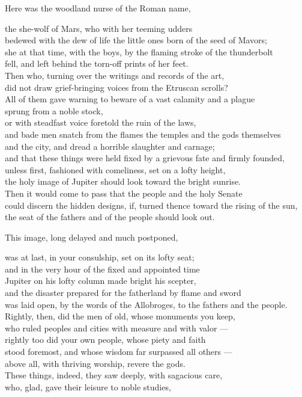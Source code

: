  Here was the woodland nurse of the Roman name,

the she-wolf of Mars, who with her teeming udders \\
bedewed with the dew of life the little ones born of the seed of Mavors; \\
she at that time, with the boys, by the flaming stroke of the thunderbolt \\
fell, and left behind the torn-off prints of her feet. \\
Then who, turning over the writings and records of the art, \\
did not draw grief-bringing voices from the Etruscan scrolls? \\
All of them gave warning to beware of a vast calamity and a plague \\
sprung from a noble stock, \\
or with steadfast voice foretold the ruin of the laws, \\
and bade men snatch from the flames the temples and the gods themselves \\
and the city, and dread a horrible slaughter and carnage; \\
and that these things were held fixed by a grievous fate and firmly founded, \\
unless first, fashioned with comeliness, set on a lofty height, \\
the holy image of Jupiter should look toward the bright sunrise. \\
Then it would come to pass that the people and the holy Senate \\
could discern the hidden designs, if, turned thence toward the rising of the sun, \\
the seat of the fathers and of the people should look out.

 This image, long delayed and much postponed,

was at last, in your consulship, set on its lofty seat; \\
and in the very hour of the fixed and appointed time \\
Jupiter on his lofty column made bright his scepter, \\
and the disaster prepared for the fatherland by flame and sword \\
was laid open, by the words of the Allobroges, to the fathers and the people. \\
Rightly, then, did the men of old, whose monuments you keep, \\
who ruled peoples and cities with measure and with valor — \\
rightly too did your own people, whose piety and faith \\
stood foremost, and whose wisdom far surpassed all others — \\
above all, with thriving worship, revere the gods. \\
These things, indeed, they saw deeply, with sagacious care, \\
who, glad, gave their leisure to noble studies,

